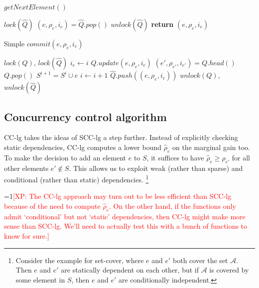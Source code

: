 \documentclass{article}
\newcommand{\Comments}{1}
\newcommand{\note}[2]{\ifnum\Comments=1\textcolor{#1}{#2}\fi}
\newcommand{\xinghao}[1]{\note{red}{[XP: #1]}}
\newcommand{\scclz}{SCC-lg}
\newcommand{\cclz}{CC-lg}
\begin{document}
\begin{algorithm}[tb]
  \caption{$getNextElement()$}
  \label{alg:scclz:getnext}
\begin{algorithmic}
  \STATE $lock(\widehat{Q})$
  \STATE $(e, \rho_e, i_e) = \widehat{Q}.pop()$
  \STATE $unlock(\widehat{Q})$
  \STATE \textbf{return} $(e, \rho_e, i_e)$
\end{algorithmic}
\end{algorithm}


\begin{algorithm}[tb]
  \caption{Simple $commit(e, \rho_e, i_e)$}
  \label{alg:scclz:commit}
\begin{algorithmic}
  \STATE $lock(Q)$, $lock(\widehat{Q})$
    \STATE $i_e \leftarrow i$
  \ENDIF
  \STATE $Q.update(e, \rho_e, i_e)$
  \STATE $(e', \rho_{e'}, i_{e'}) = Q.head()$
    \STATE $Q.pop()$
    \STATE $S^{i+1} = S^i \cup e$
    \STATE $i \leftarrow i + 1$
  \ELSE
    \STATE $\widehat{Q}.push((e, \rho_e, i_e))$
  \ENDIF
  \STATE $unlock(Q)$, $unlock(\widehat{Q})$
\end{algorithmic}
\end{algorithm}





\subsection{Concurrency control algorithm}
\cclz{} takes the ideas of \scclz{} a step further.
Instead of explicitly checking static dependencies, \cclz{} computes a lower bound $\widehat\rho_e$ on the marginal gain too.
To make the decision to add an element $e$ to $S$, it suffices to have $\widehat\rho_e \geq \rho_{e'}$ for all other elements $e' \not\in S$.
This allows us to exploit weak (rather than sparse) and conditional (rather than static) dependencies.
\footnote{
Consider the example for set-cover, where $e$ and $e'$ both cover the set $\mathcal{A}$.
Then $e$ and $e'$ are statically dependent on each other, but if $\mathcal{A}$ is covered by some element in $S$, then $e$ and $e'$ are conditionally independent.
}

\xinghao{The \cclz{} approach may turn out to be less efficient than \scclz{} because of the need to compute $\widehat\rho_e$.
On the other hand, if the functions only admit `conditional' but not `static' dependencies, then \cclz{} might make more sense than \scclz{}.
We'll need to actually test this with a bunch of functions to know for sure.}
\end{document}
